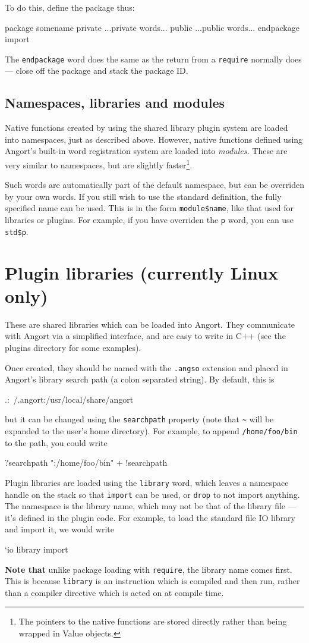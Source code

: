 To do this, define the package thus:
\begin{v}
package somename
private
...private words...
public
...public words...
endpackage import
\end{v}
The \texttt{endpackage} word does the same as the return from a 
\texttt{require} normally does --- close off the package and
stack the package ID.

\subsection{Namespaces, libraries and modules}
Native functions created by using the shared library plugin system
are loaded into namespaces, just as described above. However, native
functions defined using Angort's built-in word registration system
are loaded into \emph{modules.} These are very similar to namespaces,
but are slightly faster\footnote{The pointers to the native functions
are stored directly rather than being wrapped in Value objects.}. 

Such words are automatically part of the default namespace, but can
be overriden by your own words. If you still wish to use the standard
definition, the fully specified name can be used. This is in the form
\verb+module$name+, like that used for libraries or plugins. For example,
if you have overriden the \texttt{p} word, you can use \verb+std$p+.

\section{Plugin libraries (currently Linux only)}
These are shared libraries which can be loaded into Angort. They communicate
with Angort via a simplified interface, and are easy to write in C++ (see
the plugins directory for some examples). 

Once created, they should be named with the \texttt{.angso} extension
and placed in Angort's library search path (a colon separated string).
By default, this is 
\begin{v}
.:~/.angort:/usr/local/share/angort
\end{v}
but it can be changed using the 
\texttt{searchpath} property (note that \verb+~+ will be expanded
to the user's home directory). For example, to append \texttt{/home/foo/bin}
to the path, you could write
\begin{v}
?searchpath ":/home/foo/bin" + !searchpath
\end{v}
Plugin libraries are loaded using the \texttt{library} word, which
leaves a namespace handle on the stack so that \texttt{import} can be
used, or \texttt{drop} to not import anything. The namespace is
the library name, which may not be that of the library file --- it's defined
in the plugin code. For example, to load the standard file IO library
and import it, we would write
\begin{v}
`io library import
\end{v}
\textbf{Note that} unlike package loading with \texttt{require},
the library name comes first.
This is because \texttt{library} is an instruction which is compiled and
then run, rather than a compiler directive which is acted on
at compile time.

